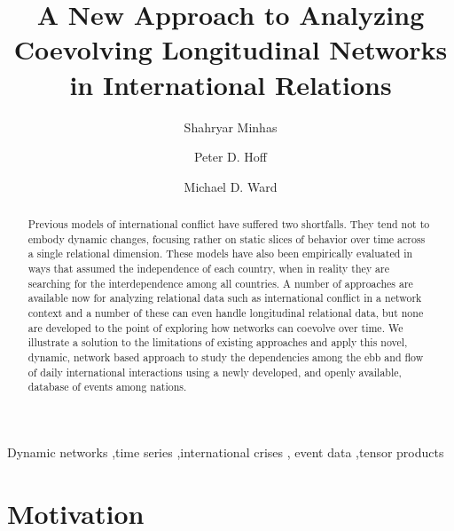 \documentclass[3p,times,twocolumn,authoryear,12pt]{elsarticle}
\begin{document}
\begin{frontmatter}

\title{A New Approach to Analyzing Coevolving Longitudinal Networks in International Relations}


\author[duke]{Shahryar Minhas}
\author[UW]{Peter D. Hoff}
\author[duke]{Michael D. Ward}
\address[duke]{Department of Political Science, Duke University, Durham, NC 27701, USA}
\address[UW]{Departments of Biostatistics \& Statistics, University of Washington, Seattle, WA, USA}


\begin{abstract}
Previous models of international conflict have suffered two shortfalls. They tend not to embody dynamic changes, focusing rather on static slices of behavior over time across a single relational dimension. These models have also been empirically evaluated in ways that assumed the independence of each country, when in reality they are searching for the interdependence among all countries. A number of approaches are available now for analyzing relational data such as international conflict in a network context and a number of these can even handle longitudinal relational data, but none are developed to the point of exploring how networks can coevolve over time. We illustrate a solution to the limitations of existing approaches and apply this novel, dynamic, network based approach to study the dependencies among the ebb and flow of daily international interactions using a newly developed, and openly available, database of events among nations. 

\end{abstract}

\begin{keyword}
Dynamic networks \sep time series \sep international crises \sep 
event data \sep tensor products
\end{keyword}

\end{frontmatter}

\section{Motivation}
\end{document}
